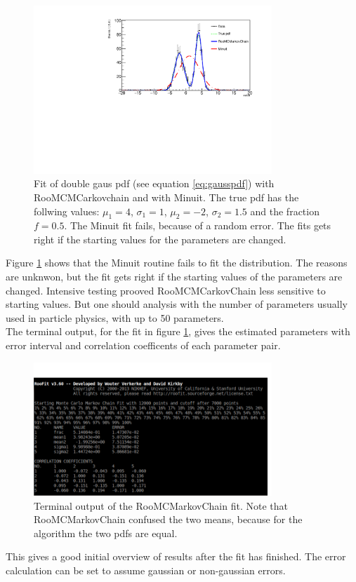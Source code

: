 \documentclass[english]{uzhpub}
\begin{document}
\begin{figure}[H]
  \centering
  \includegraphics[width=0.8\textwidth]{RooMCMC/twogausfit}
  \caption{Fit of double gaus pdf (see equation \ref{eq:gausspdf}) with RooMCMCarkovchain and with Minuit. The true pdf has the follwing values: $\mu_1 = 4$, $\sigma_1 = 1$, $\mu_2 = -2$, $\sigma_2 = 1.5$ and the fraction $f = 0.5$. The Minuit fit fails, because of a random error. The fits gets right if the starting values for the parameters are changed.}
  \label{fig:twogaus}
\end{figure}
Figure \ref{fig:twogaus} shows that the Minuit routine fails to fit the distribution. The reasons are unknwon, but the fit gets right if the starting values of the parameters are changed. Intensive testing prooved RooMCMCarkovChain less sensitive to starting values. But one should analysis with the number of parameters usually used in particle physics, with up to 50 parameters. \\
The terminal output, for the fit in figure \ref{fig:twogaus}, gives the estimated parameters with error interval and correlation coefficents of each parameter pair.

\begin{figure}[H]
  \centering
  \includegraphics[width=0.8\textwidth]{RooMCMC/terminal_output}
  \caption{Terminal output of the RooMCMarkovChain fit. Note that RooMCMarkovChain confused the two means, because for the algorithm the two pdfs are equal.}
  \label{fig:terminal}
\end{figure}
This gives a good initial overview of results after the fit has finished. The error calculation can be set to assume gaussian or non-gaussian errors.
\end{document}
